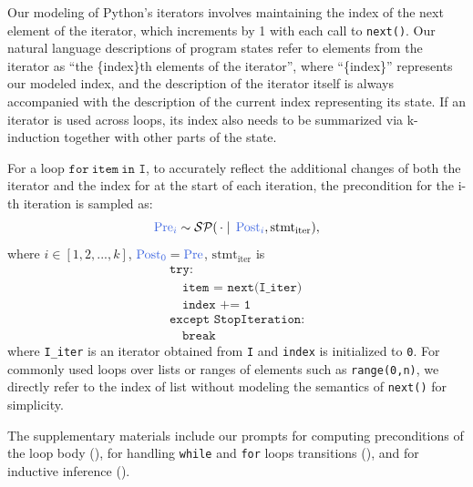 \documentclass[sigconf]{acmart}
\makeatletter
\def\mathcolor#1#{\@mathcolor{#1}}
\def\@mathcolor#1#2#3{%
  \protect\leavevmode
  \begingroup
    \color#1{#2}#3%
  \endgroup
}
\makeatother
\begin{document}
Our modeling of Python's iterators involves maintaining the index of the next element of the iterator, which increments by 1 with each call to \texttt{next()}. Our natural language descriptions of program states refer to elements from the iterator as ``the \{index\}th elements of the iterator'', where ``\{index\}'' represents our modeled index, and the description of the iterator itself is always accompanied with the description of the current index representing its state. If an iterator is used across loops, its index also needs to be summarized via k-induction together with other parts of the state.

For a loop $\texttt{for}\ \texttt{item} \ \texttt{in I}$, to accurately reflect the additional changes of both the iterator and the index for  at the start of each iteration, the precondition for the i-th iteration is sampled as:
$$
\mathcolor{softblue}{\mathrm{Pre}_i}\sim \mathcal{SP}(\,\cdot\mid\,\mathcolor{softblue}{\mathrm{Post}_i}, \text{stmt}_\mathrm{iter}),
$$
where $i\in[1,2,...,k]$, $\mathcolor{softblue}{\mathrm{Post_0}}=\mathcolor{softblue}{\mathrm{Pre}}$, $\text{stmt}_\mathrm{iter}$ is 
\[
\begin{array}{l}
\texttt{try:}\\
\quad\texttt{item = next(I\_iter})\\
\quad\texttt{index += 1}\\
\texttt{except StopIteration:}\\
\quad\texttt{break}
\end{array}
\]
where \texttt{I\_iter} is an iterator obtained from \texttt{I} and \texttt{index} is initialized to \texttt{0}. For commonly used loops over lists or ranges of elements such as \texttt{range(0,n)}, we directly refer to the index of list without modeling the semantics of \texttt{next()} for simplicity.

The supplementary materials include our prompts for computing preconditions of the loop body (), for handling \texttt{while} and \texttt{for} loops transitions (), and for inductive inference ().

\end{document}

